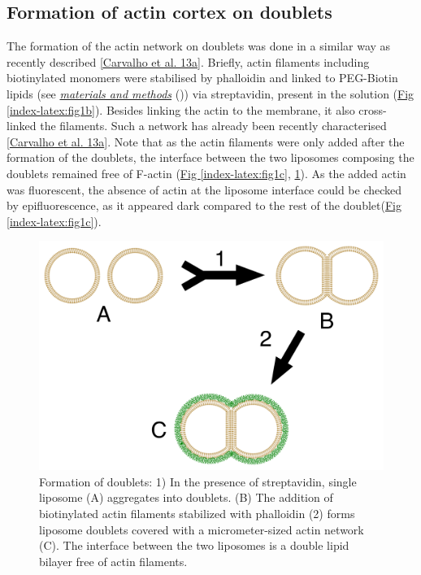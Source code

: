 \documentclass[A4paperpaper,11pt,english]{sphinxmanual}
\begin{document}
\subsection{Formation of actin cortex on doublets}
\label{index-latex:formation-of-actin-cortex-on-doublets}
The formation of the actin network on doublets was done in a similar way as recently described
{\hyperref[index-latex:carvalho2013a]{{[}Carvalho et al. 13a{]}}}.  Briefly, actin filaments including
biotinylated monomers were stabilised by phalloidin and linked to PEG-Biotin
lipids (see {\hyperref[index-latex:m-et-m]{\emph{materials and methods}}} ())  via streptavidin,
present in the solution (\hyperref[index-latex:fig1b]{Fig  \ref*{index-latex:fig1b}}).  Besides linking the actin to the
membrane, it also cross-linked the filaments.  Such a network has already been
recently characterised {\hyperref[index-latex:carvalho2013a]{{[}Carvalho et al. 13a{]}}}.  Note that as the actin filaments
were only added after the formation of the doublets, the interface between the
two liposomes composing the doublets remained free of F-actin (\hyperref[index-latex:fig1c]{Fig  \ref*{index-latex:fig1c}}, \hyperref[index-latex:fds]{ \ref*{index-latex:fds}}). As the added actin was fluorescent, the absence of actin
at the liposome interface could be checked by epifluorescence, as it appeared dark
compared to the rest of the doublet(\hyperref[index-latex:fig1c]{Fig  \ref*{index-latex:fig1c}}).
\begin{figure}[htbp]
\centering
\capstart

\includegraphics[width=0.700\linewidth]{doublets-schema.png}
\caption{Formation of doublets: 1) In the presence of streptavidin, single liposome
(A) aggregates into doublets. (B) The addition of biotinylated actin
filaments stabilized with phalloidin (2) forms liposome doublets covered
with a micrometer-sized actin network (C). The interface between the two
liposomes is a double lipid bilayer free of actin filaments.}\label{index-latex:fds}\end{figure}
\end{document}
